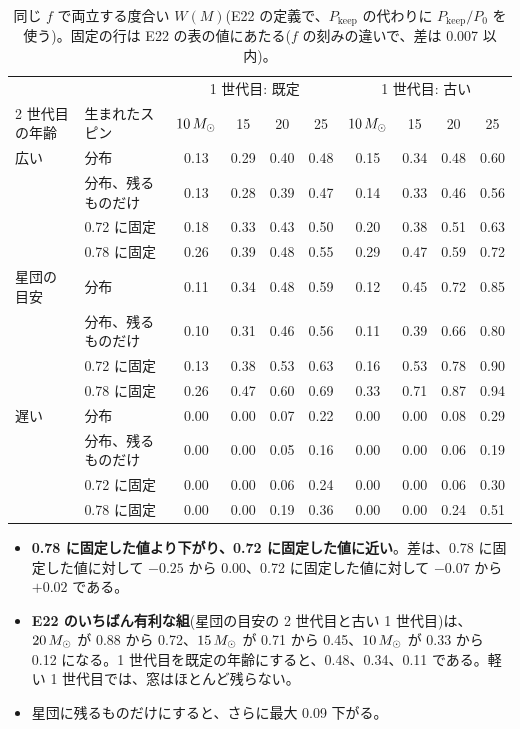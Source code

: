 \begin{table}[H]
\centering\small
\begin{tabular}{llcccc@{\qquad}cccc}
\toprule
 & & \multicolumn{4}{c}{1 世代目: 既定} & \multicolumn{4}{c}{1 世代目: 古い}\\
2 世代目の年齢 & 生まれたスピン & $10\,M_\odot$ & 15 & 20 & 25 & $10\,M_\odot$ & 15 & 20 & 25\\
\midrule
広い & 分布 & 0.13 & 0.29 & 0.40 & 0.48 & 0.15 & 0.34 & 0.48 & 0.60\\
 & 分布、残るものだけ & 0.13 & 0.28 & 0.39 & 0.47 & 0.14 & 0.33 & 0.46 & 0.56\\
 & 0.72 に固定 & 0.18 & 0.33 & 0.43 & 0.50 & 0.20 & 0.38 & 0.51 & 0.63\\
 & 0.78 に固定 & 0.26 & 0.39 & 0.48 & 0.55 & 0.29 & 0.47 & 0.59 & 0.72\\
\midrule
星団の目安 & 分布 & 0.11 & 0.34 & 0.48 & 0.59 & 0.12 & 0.45 & 0.72 & 0.85\\
 & 分布、残るものだけ & 0.10 & 0.31 & 0.46 & 0.56 & 0.11 & 0.39 & 0.66 & 0.80\\
 & 0.72 に固定 & 0.13 & 0.38 & 0.53 & 0.63 & 0.16 & 0.53 & 0.78 & 0.90\\
 & 0.78 に固定 & 0.26 & 0.47 & 0.60 & 0.69 & 0.33 & 0.71 & 0.87 & 0.94\\
\midrule
遅い & 分布 & 0.00 & 0.00 & 0.07 & 0.22 & 0.00 & 0.00 & 0.08 & 0.29\\
 & 分布、残るものだけ & 0.00 & 0.00 & 0.05 & 0.16 & 0.00 & 0.00 & 0.06 & 0.19\\
 & 0.72 に固定 & 0.00 & 0.00 & 0.06 & 0.24 & 0.00 & 0.00 & 0.06 & 0.30\\
 & 0.78 に固定 & 0.00 & 0.00 & 0.19 & 0.36 & 0.00 & 0.00 & 0.24 & 0.51\\
\bottomrule
\end{tabular}
\caption{同じ $f$ で両立する度合い $W(M)$(E22 の定義で、$P_\mathrm{keep}$ の代わりに $P_\mathrm{keep}/P_0$ を使う)。固定の行は E22 の表の値にあたる($f$ の刻みの違いで、差は 0.007 以内)。}
\label{tab:e23W}
\end{table}

\begin{itemize}
\item \textbf{0.78 に固定した値より下がり、0.72 に固定した値に近い}。差は、0.78 に固定した値に対して $-0.25$ から $0.00$、0.72 に固定した値に対して $-0.07$ から $+0.02$ である。
\item \textbf{E22 のいちばん有利な組}(星団の目安の 2 世代目と古い 1 世代目)は、$20\,M_\odot$ が 0.88 から 0.72、$15\,M_\odot$ が 0.71 から 0.45、$10\,M_\odot$ が 0.33 から 0.12 になる。1 世代目を既定の年齢にすると、0.48、0.34、0.11 である。軽い 1 世代目では、窓はほとんど残らない。
\item 星団に残るものだけにすると、さらに最大 0.09 下がる。
\end{itemize}

